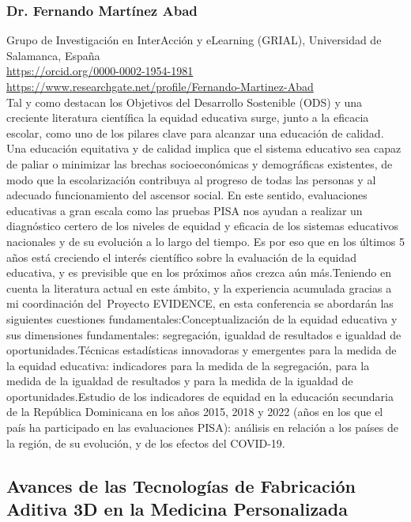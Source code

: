 \documentclass[11pt,a4paper]{article}
\begin{document}
{\centering
\subsubsection*{Dr. Fernando Martínez Abad}\par}
Grupo de Investigación en InterAcción y eLearning (GRIAL), Universidad de Salamanca, España \\
    \url{https://orcid.org/0000-0002-1954-1981} \\
    \url{https://www.researchgate.net/profile/Fernando-Martinez-Abad} \\

\noindent
Tal y como destacan los Objetivos del Desarrollo Sostenible (ODS) y una creciente literatura científica la equidad educativa surge, junto a la eficacia escolar, como uno de los pilares clave para alcanzar una educación de calidad. Una educación equitativa y de calidad implica que el sistema educativo sea capaz de paliar o minimizar las brechas socioeconómicas y demográficas existentes, de modo que la escolarización contribuya al progreso de todas las personas y al adecuado funcionamiento del ascensor social. En este sentido, evaluaciones educativas a gran escala como las pruebas PISA nos ayudan a realizar un diagnóstico certero de los niveles de equidad y eficacia de los sistemas educativos nacionales y de su evolución a lo largo del tiempo. Es por eso que en los últimos 5 años está creciendo el interés científico sobre la evaluación de la equidad educativa, y es previsible que en los próximos años crezca aún más.Teniendo en cuenta la literatura actual en este ámbito, y la experiencia acumulada gracias a mi coordinación del Proyecto EVIDENCE, en esta conferencia se abordarán las siguientes cuestiones fundamentales:Conceptualización de la equidad educativa y sus dimensiones fundamentales: segregación, igualdad de resultados e igualdad de oportunidades.Técnicas estadísticas innovadoras y emergentes para la medida de la equidad educativa: indicadores para la medida de la segregación, para la medida de la igualdad de resultados y para la medida de la igualdad de oportunidades.Estudio de los indicadores de equidad en la educación secundaria de la República Dominicana en los años 2015, 2018 y 2022 (años en los que el país ha participado en las evaluaciones PISA): análisis en relación a los países de la región, de su evolución, y de los efectos del COVID-19.


\subsection{Avances de las Tecnologías de Fabricación Aditiva 3D en la Medicina Personalizada}
\end{document}
